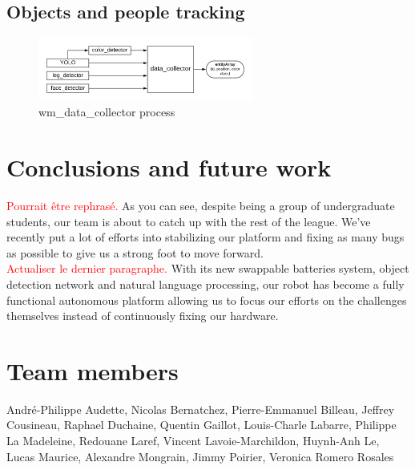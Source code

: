 \documentclass[runningheads,a4paper]{llncs}
\newcommand\notes[1]{\textcolor{red}{#1}}
\begin{document}
\subsection{Objects and people tracking}

\begin{figure}
  \centering
  \includegraphics[width=200pt]{images/wm_data_collector.png}
  \caption{ wm\_data\_collector process}
\end{figure} 

\newpage

\section{Conclusions and future work} 
\notes{Pourrait être rephrasé.}
As you can see, despite being a group of undergraduate students, our team is about to catch up with the rest of the league. We’ve recently put a lot of efforts into stabilizing our platform and fixing as many bugs as possible to give us a strong foot to move forward.\\

\notes{Actualiser le dernier paragraphe.}
With its new swappable batteries system, object detection network and natural language processing, our robot has become a fully functional autonomous platform allowing us to focus our efforts on the challenges themselves instead of continuously fixing our hardware.
\\


	
\section*{Team members}
André-Philippe Audette,
Nicolas Bernatchez,
Pierre-Emmanuel Billeau,
Jeffrey Cousineau, 
Raphael Duchaine,
Quentin Gaillot,
Louis-Charle Labarre, 
Philippe La Madeleine,  
Redouane Laref,
Vincent Lavoie-Marchildon,
Huynh-Anh Le,
Lucas Maurice,
Alexandre Mongrain,
Jimmy Poirier,
Veronica Romero Rosales

\nocite{*}


\end{document}
